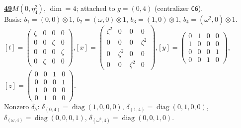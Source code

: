 \begin{samepage}\noindent\textbf{\underline{49}}\quad $M(0,\eta^{2}_{4})$, $\dim=4$; attached to $g=(0,4)$ (centralizer \texttt{C6}).\\
Basis: $b_{1}=(0,0)\otimes 1$, $b_{2}=(\omega,0)\otimes 1$, $b_{3}=(1,0)\otimes 1$, $b_{4}=(\omega^2,0)\otimes 1$.\\
$[t]=\left(\begin{smallmatrix} \zeta & 0 & 0 & 0 \\ 0 & 0 & \zeta & 0 \\ 0 & 0 & 0 & \zeta \\ 0 & \zeta & 0 & 0 \end{smallmatrix}\right)$,\quad $[x]=\left(\begin{smallmatrix} \zeta^2 & 0 & 0 & 0 \\ 0 & 0 & 0 & \zeta^2 \\ 0 & \zeta^2 & 0 & 0 \\ 0 & 0 & \zeta^2 & 0 \end{smallmatrix}\right)$,\quad $[y]=\left(\begin{smallmatrix} 0 & 1 & 0 & 0 \\ 1 & 0 & 0 & 0 \\ 0 & 0 & 0 & 1 \\ 0 & 0 & 1 & 0 \end{smallmatrix}\right)$,\quad $[z]=\left(\begin{smallmatrix} 0 & 0 & 1 & 0 \\ 0 & 0 & 0 & 1 \\ 1 & 0 & 0 & 0 \\ 0 & 1 & 0 & 0 \end{smallmatrix}\right)$.\\
Nonzero $\delta_h$: $\delta_{(0,4)}=\operatorname{diag}(1,0,0,0)$, $\delta_{(1,4)}=\operatorname{diag}(0,1,0,0)$, $\delta_{(\omega,4)}=\operatorname{diag}(0,0,0,1)$, $\delta_{(\omega^2,4)}=\operatorname{diag}(0,0,1,0)$.\end{samepage}
\medskip

